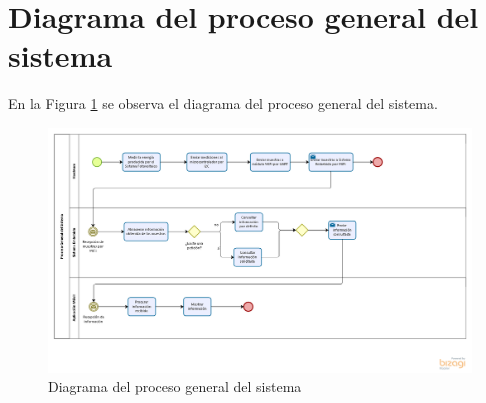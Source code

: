 \section{Diagrama del proceso general del sistema}
En la Figura \ref{fig:proceso_general} se observa el diagrama del proceso general del sistema.
\begin{figure}[H]
	\centering
	\includegraphics[scale=.35]{Capitulo4/images/procesoGeneral}
	\caption{Diagrama del proceso general del sistema}
	\label{fig:proceso_general}
\end{figure}